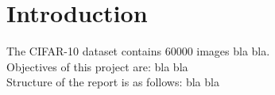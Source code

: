 \section{Introduction}
    \pagestyle{tom}
    
The CIFAR-10 dataset contains 60000 images bla bla.\cite{krizhevsky}\\
Objectives of this project are: bla bla\\
Structure of the report is as follows: bla bla\\
